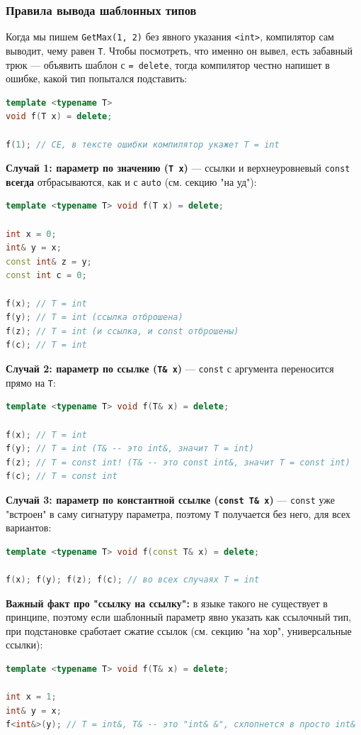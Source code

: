 \subsubsection{Правила вывода шаблонных типов}
Когда мы пишем \texttt{GetMax(1, 2)} без явного указания \texttt{<int>}, компилятор сам выводит, чему равен \texttt{T}. Чтобы посмотреть, что именно он вывел, есть забавный трюк --- объявить шаблон с \texttt{= delete}, тогда компилятор честно напишет в ошибке, какой тип попытался подставить:
\begin{lstlisting}[language=C++]
template <typename T>
void f(T x) = delete;

f(1); // CE, в тексте ошибки компилятор укажет T = int
\end{lstlisting}
\textbf{Случай 1: параметр по значению (\texttt{T x})} --- ссылки и верхнеуровневый \texttt{const} \textbf{всегда} отбрасываются, как и с \texttt{auto} (см. секцию "на уд"):
\begin{lstlisting}[language=C++]
template <typename T> void f(T x) = delete;

int x = 0;
int& y = x;
const int& z = y;
const int c = 0;

f(x); // T = int
f(y); // T = int (ссылка отброшена)
f(z); // T = int (и ссылка, и const отброшены)
f(c); // T = int
\end{lstlisting}
\textbf{Случай 2: параметр по ссылке (\texttt{T\& x})} --- \texttt{const} с аргумента переносится прямо на \texttt{T}:
\begin{lstlisting}[language=C++]
template <typename T> void f(T& x) = delete;

f(x); // T = int
f(y); // T = int (T& -- это int&, значит T = int)
f(z); // T = const int! (T& -- это const int&, значит T = const int)
f(c); // T = const int
\end{lstlisting}
\textbf{Случай 3: параметр по константной ссылке (\texttt{const T\& x})} --- \texttt{const} уже "встроен" в саму сигнатуру параметра, поэтому \texttt{T} получается без него, для всех вариантов:
\begin{lstlisting}[language=C++]
template <typename T> void f(const T& x) = delete;

f(x); f(y); f(z); f(c); // во всех случаях T = int
\end{lstlisting}
\textbf{Важный факт про "ссылку на ссылку":} в языке такого не существует в принципе, поэтому если шаблонный параметр явно указать как ссылочный тип, при подстановке сработает сжатие ссылок (см. секцию "на хор", универсальные ссылки):
\begin{lstlisting}[language=C++]
template <typename T> void f(T& x) = delete;

int x = 1;
int& y = x;
f<int&>(y); // T = int&, T& -- это "int& &", схлопнется в просто int&
\end{lstlisting}
